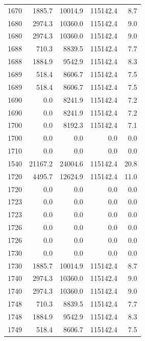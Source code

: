 \begin{longtable}{rrrrr}
    1670 & \num{1885.7} & \num{10014.9} & \num{115142.4} & 8.7 \\
    1680 & \num{2974.3} & \num{10360.0} & \num{115142.4} & 9.0 \\
    1680 & \num{2974.3} & \num{10360.0} & \num{115142.4} & 9.0 \\
    1688 & \num{710.3} & \num{8839.5} & \num{115142.4} & 7.7 \\
    1688 & \num{1884.9} & \num{9542.9} & \num{115142.4} & 8.3 \\
    1689 & \num{518.4} & \num{8606.7} & \num{115142.4} & 7.5 \\
    1689 & \num{518.4} & \num{8606.7} & \num{115142.4} & 7.5 \\
    1690 & \num{0.0} & \num{8241.9} & \num{115142.4} & 7.2 \\
    1690 & \num{0.0} & \num{8241.9} & \num{115142.4} & 7.2 \\
    1700 & \num{0.0} & \num{8192.3} & \num{115142.4} & 7.1 \\
    1700 & \num{0.0} & \num{0.0} & \num{0.0} & 0.0 \\
    1710 & \num{0.0} & \num{0.0} & \num{0.0} & 0.0 \\
    1540 & \num{21167.2} & \num{24004.6} & \num{115142.4} & 20.8 \\
    1720 & \num{4495.7} & \num{12624.9} & \num{115142.4} & 11.0 \\
    1720 & \num{0.0} & \num{0.0} & \num{0.0} & 0.0 \\
    1723 & \num{0.0} & \num{0.0} & \num{0.0} & 0.0 \\
    1723 & \num{0.0} & \num{0.0} & \num{0.0} & 0.0 \\
    1726 & \num{0.0} & \num{0.0} & \num{0.0} & 0.0 \\
    1726 & \num{0.0} & \num{0.0} & \num{0.0} & 0.0 \\
    1730 & \num{0.0} & \num{0.0} & \num{0.0} & 0.0 \\
    1730 & \num{1885.7} & \num{10014.9} & \num{115142.4} & 8.7 \\
    1740 & \num{2974.3} & \num{10360.0} & \num{115142.4} & 9.0 \\
    1740 & \num{2974.3} & \num{10360.0} & \num{115142.4} & 9.0 \\
    1748 & \num{710.3} & \num{8839.5} & \num{115142.4} & 7.7 \\
    1748 & \num{1884.9} & \num{9542.9} & \num{115142.4} & 8.3 \\
    1749 & \num{518.4} & \num{8606.7} & \num{115142.4} & 7.5 \\

\end{longtable}
